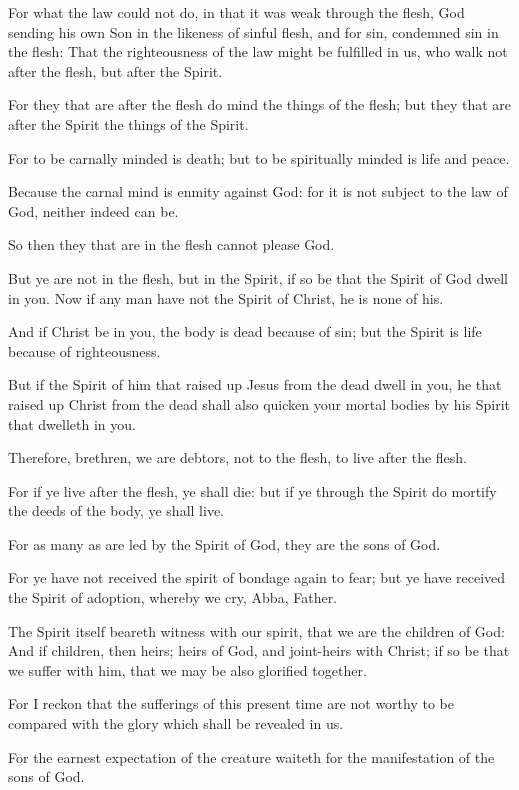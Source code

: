\Verse For what the law could not do, in that it was weak through the flesh, God sending his own Son in the likeness of sinful flesh, and for sin, condemned sin in the flesh: \Verse That the righteousness of the law might be fulfilled in us, who walk not after the flesh, but after the Spirit.

\Verse For they that are after the flesh do mind the things of the flesh; but they that are after the Spirit the things of the Spirit.

\Verse For to be carnally minded is death; but to be spiritually minded is life and peace.

\Verse Because the carnal mind is enmity against God: for it is not subject to the law of God, neither indeed can be.

\Verse So then they that are in the flesh cannot please God.

\Verse But ye are not in the flesh, but in the Spirit, if so be that the Spirit of God dwell in you. Now if any man have not the Spirit of Christ, he is none of his.

\Verse And if Christ be in you, the body is dead because of sin; but the Spirit is life because of righteousness.

\Verse But if the Spirit of him that raised up Jesus from the dead dwell in you, he that raised up Christ from the dead shall also quicken your mortal bodies by his Spirit that dwelleth in you.

\Verse Therefore, brethren, we are debtors, not to the flesh, to live after the flesh.

\Verse For if ye live after the flesh, ye shall die: but if ye through the Spirit do mortify the deeds of the body, ye shall live.

\Verse For as many as are led by the Spirit of God, they are the sons of God.

\Verse For ye have not received the spirit of bondage again to fear; but ye have received the Spirit of adoption, whereby we cry, Abba, Father.

\Verse The Spirit itself beareth witness with our spirit, that we are the children of God: \Verse And if children, then heirs; heirs of God, and joint-heirs with Christ; if so be that we suffer with him, that we may be also glorified together.

\Verse For I reckon that the sufferings of this present time are not worthy to be compared with the glory which shall be revealed in us.

\Verse For the earnest expectation of the creature waiteth for the manifestation of the sons of God.


